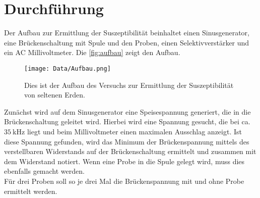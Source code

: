 \section{Durchführung}
\label{sec:Durchführung}

Der Aufbau zur Ermittlung der Suszeptibilität beinhaltet einen Sinusgenerator, eine Brückenschaltung mit Spule und den Proben, einen Selektivverstärker und ein AC Millivoltmeter.
Die \autoref{fig:aufbau} zeigt den Aufbau.

\begin{figure}[htbp]
    \centering
    \texttt{[image: Data/Aufbau.png]}
    \caption{Dies ist der Aufbau des Versuchs zur Ermittlung der Suszeptibilität von seltenen Erden.}
    \label{fig:aufbau}
\end{figure}

Zunächst wird auf dem Sinusgenerator eine Speisespannung generiert, die in die Brückenschaltung geleitet wird.
Hierbei wird eine Spannung gesucht, die bei ca. $\SI{35}{\kilo\hertz}$ liegt und beim Millivoltmeter einen maximalen Ausschlag anzeigt.
Ist diese Spannung gefunden, wird das Minimum der Brückenspannung mittels des verstellbaren Widerstands auf der Brückenschaltung ermittelt und zusammen mit dem Widerstand notiert.
Wenn eine Probe in die Spule gelegt wird, muss dies ebenfalls gemacht werden.\\
Für drei Proben soll so je drei Mal die Brückenspannung mit und ohne Probe ermittelt werden.